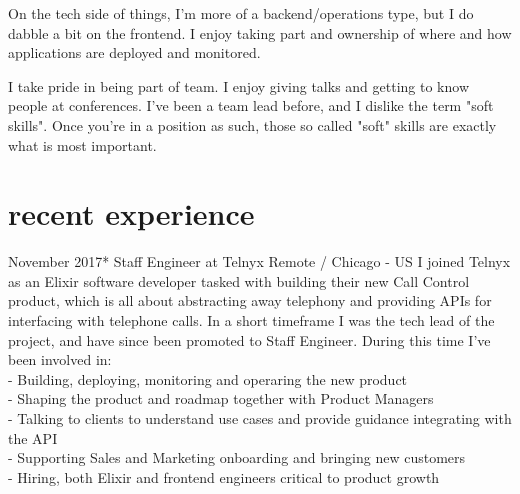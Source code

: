 \documentclass{nirev-cv}
\begin{document}
On the tech side of things, I'm more of a backend/operations type, but I do dabble a bit on the frontend.
I enjoy taking part and ownership of where and how applications are deployed and monitored.

I take pride in being part of team. I enjoy giving talks and getting to know people at conferences.
I've been a team lead before, and I dislike the term "soft skills". Once you're in a position as such, those so called "soft" skills are exactly what is most important. 

\section{recent experience}

\workentry
    {November 2017}{*}
    {Staff Engineer at Telnyx}
    {Remote / Chicago - US}
    {I joined Telnyx as an Elixir software developer tasked with building their new Call Control product, 
    which is all about abstracting away telephony and providing APIs for interfacing with telephone calls.
    In a short timeframe I was the tech lead of the project, and have since been promoted to Staff Engineer. During this time I've been involved in: \\ \small
    - Building, deploying, monitoring and operaring the new product \\
    - Shaping the product and roadmap together with Product Managers \\
    - Talking to clients to understand use cases and provide guidance integrating with the API \\
    - Supporting Sales and Marketing onboarding and bringing new customers \\
    - Hiring, both Elixir and frontend engineers critical to product growth
    }
\end{document}
